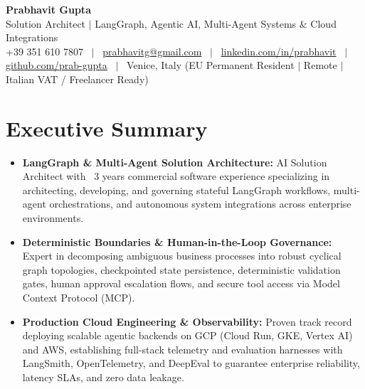 \documentclass[a4paper,10pt]{article}
\begin{document}
\begin{minipage}[c]{0.80\textwidth}
  {\Huge\bfseries Prabhavit Gupta}\\[3pt]
  {\color{accent}\large Solution Architect $\vert$ LangGraph, Agentic AI, Multi-Agent Systems $\&$ Cloud Integrations}\\[6pt]
  {\footnotesize +39 351 610 7807 ~$\vert$~
  \href{mailto:prabhavitg@gmail.com}{prabhavitg@gmail.com} ~$\vert$~
  \href{https://www.linkedin.com/in/prabhavit/}{linkedin.com/in/prabhavit} ~$\vert$~
  \href{https://github.com/prab-gupta}{github.com/prab-gupta} ~$\vert$~
  Venice, Italy (EU Permanent Resident $\vert$ Remote $\vert$ Italian VAT / Freelancer Ready)}
\end{minipage}\hfill

\vspace{6pt}

\section{Executive Summary}
\begin{itemize}
  \item \textbf{LangGraph \& Multi-Agent Solution Architecture:} AI Solution Architect with ~3 years commercial software experience specializing in architecting, developing, and governing stateful LangGraph workflows, multi-agent orchestrations, and autonomous system integrations across enterprise environments.
  \item \textbf{Deterministic Boundaries \& Human-in-the-Loop Governance:} Expert in decomposing ambiguous business processes into robust cyclical graph topologies, checkpointed state persistence, deterministic validation gates, human approval escalation flows, and secure tool access via Model Context Protocol (MCP).
  \item \textbf{Production Cloud Engineering \& Observability:} Proven track record deploying scalable agentic backends on GCP (Cloud Run, GKE, Vertex AI) and AWS, establishing full-stack telemetry and evaluation harnesses with LangSmith, OpenTelemetry, and DeepEval to guarantee enterprise reliability, latency SLAs, and zero data leakage.
\end{itemize}

\end{document}
